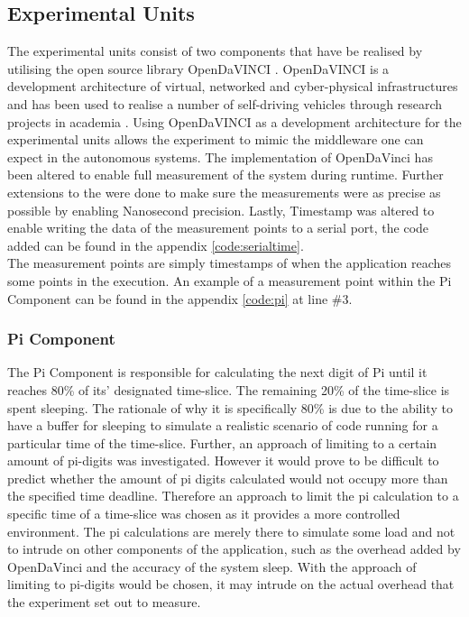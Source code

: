 \subsection{Experimental Units}
\label{section:exp-units}

The experimental units consist of two components that have be realised by utilising the open source library OpenDaVINCI \cite{OpenDaVINCI}. OpenDaVINCI is a development architecture of virtual, networked and cyber-physical infrastructures and has been used to realise a number of self-driving vehicles through research projects in academia \cite{OpenDaVINCI}. Using OpenDaVINCI as a development architecture for the experimental units allows the experiment to mimic the middleware one can expect in the autonomous systems. The implementation of OpenDaVinci has been altered to enable full measurement of the system during runtime. Further extensions to the were done to make sure the measurements were as precise as possible by enabling Nanosecond precision. Lastly, Timestamp was altered to enable writing the data of the measurement points to a serial port, the code added can be found in the appendix \ref{code:serialtime}.\\
The measurement points are simply timestamps of when the application reaches some points in the execution. An example of a measurement point within the Pi Component can be found in the appendix \ref{code:pi} at line \#3.\\


\subsubsection{Pi Component}

The Pi Component is responsible for calculating the next digit of Pi until it reaches 80\% of its' designated time-slice. The remaining 20\% of the time-slice is spent sleeping. The rationale of why it is specifically 80\% is due to the ability to have a buffer for sleeping to simulate a realistic scenario of code running for a particular time of the time-slice. Further, an approach of limiting to a certain amount of pi-digits was investigated. However it would prove to be difficult to predict whether the amount of pi digits calculated would not occupy more than the specified time deadline. Therefore an approach to limit the pi calculation to a specific time of a time-slice was chosen as it provides a more controlled environment. The pi calculations are merely there to simulate some load and not to intrude on other components of the application, such as the overhead added by OpenDaVinci and the accuracy of the system sleep. With the approach of limiting to pi-digits would be chosen, it may intrude on the actual overhead that the experiment set out to measure.\\

